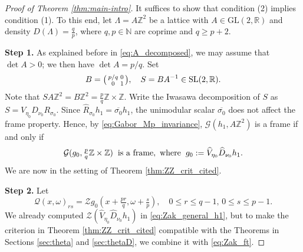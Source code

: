 \documentclass[reqno,a4paper,12pt]{amsart}
\numberwithin{equation}{section}
\newcommand{\N}{\mathbb N}
\newcommand{\Z}{\mathbb Z}
\newcommand{\R}{\mathbb R}
\newcommand{\calG}{\mathcal G}
\newcommand{\QQ}{\mathcal{Q}}
\newcommand{\zak}{\mathcal{Z}}
\begin{document}
\begin{proof}[Proof of Theorem \ref{thm:main-intro}]

It suffices to show that condition (2) implies condition (1). To this end, let
$\Lambda=A\Z^2$ be a lattice with $A\in\mathrm{GL}(2,\R)$ and density
$D(\Lambda)=\tfrac{q}{p}$, where $q,p \in \N$ are coprime and $q\geq p+2$.

\textbf{Step 1.} 
As explained before in \eqref{eq:A_decomposed}, we may assume that $\det A>0$;
we then have $\det A=p/q$.  Set
$$
B=\begin{psmallmatrix}p/q&0\\0&1\end{psmallmatrix},
\quad S=BA^{-1}\in\mathrm{SL}(2,\R).
$$
Note that $SA\Z^2=B\Z^2=\tfrac pq\Z\times\Z$.  Write the Iwasawa
decomposition of $S$ as $S=V_{\eta_0}D_{\nu_0}R_{\sigma_0}$.  Since
$\widehat R_{\sigma_0}h_1=\overline{\sigma_0}h_1$, the unimodular scalar
$\overline{\sigma_0}$ does not affect the frame property.  Hence, by
\eqref{eq:Gabor_Mp_invariance}, $\calG(h_1,A\Z^2)$ is a frame if and only if
$$
\calG(g_0,\tfrac pq\Z\times\Z)\hspace{2mm}\text{is a frame}, \ \text{where}
\hspace{2mm} g_0:=\widehat V_{\eta_0}\widehat D_{\nu_0}h_1.
$$
We are now in the setting of Theorem \ref{thm:ZZ_crit_cited}.

     \textbf{Step 2.}
     Let 
     \begin{equation}
         \QQ(x,\omega)_{rs} = \zak g_0( x+\tfrac{pr}{q}, \omega +\tfrac{s}{p}) ,\quad 0\leq r\leq q-1,\, 0\leq s\leq p-1.
     \end{equation}
     We already computed $\zak (\widehat{V}_{\eta_0} \widehat{D}_{\nu_0}h_1)$ in \eqref{eq:Zak_general_h1}, but to make the criterion in Theorem \ref{thm:ZZ_crit_cited}
     compatible with the Theorems in Sections \ref{sec:theta} and \ref{sec:thetaD}, we combine it with \eqref{eq:Zak_ft}.


\end{proof}
\end{document}
